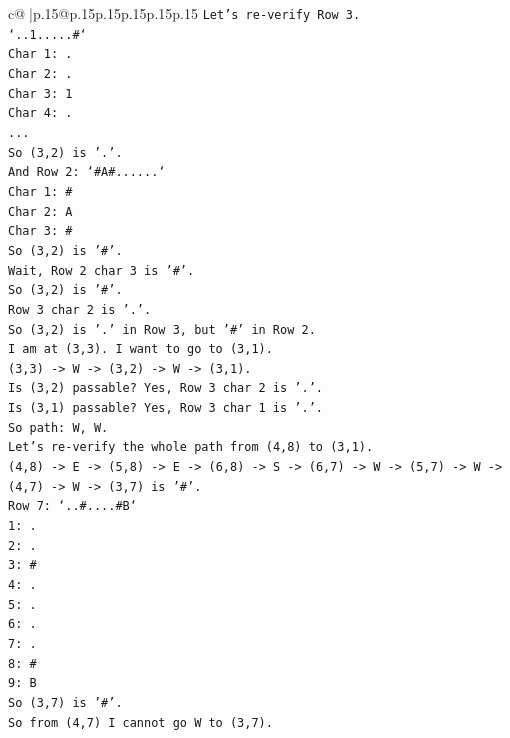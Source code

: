 \documentclass{article}
\begin{document}
{\begin{supertabular}{c@{$\;$}|p{.15\linewidth}@{}p{.15\linewidth}p{.15\linewidth}p{.15\linewidth}p{.15\linewidth}p{.15\linewidth}}
{{{\texttt{Let's re{-}verify Row 3.} \\
\texttt{`..1.....\#`} \\
\texttt{Char 1: .} \\
\texttt{Char 2: .} \\
\texttt{Char 3: 1} \\
\texttt{Char 4: .} \\
\texttt{...} \\
\texttt{So (3,2) is '.'.} \\
\texttt{And Row 2: `\#A\#......`} \\
\texttt{Char 1: \#} \\
\texttt{Char 2: A} \\
\texttt{Char 3: \#} \\
\texttt{So (3,2) is '\#'.} \\
\texttt{Wait, Row 2 char 3 is '\#'.} \\
\texttt{So (3,2) is '\#'.} \\
\texttt{Row 3 char 2 is '.'.} \\
\texttt{So (3,2) is '.' in Row 3, but '\#' in Row 2.} \\
\texttt{I am at (3,3). I want to go to (3,1).} \\
\texttt{(3,3) {-}> W {-}> (3,2) {-}> W {-}> (3,1).} \\
\texttt{Is (3,2) passable? Yes, Row 3 char 2 is '.'.} \\
\texttt{Is (3,1) passable? Yes, Row 3 char 1 is '.'.} \\
\texttt{So path: W, W.} \\
\texttt{Let's re{-}verify the whole path from (4,8) to (3,1).} \\
\texttt{(4,8) {-}> E {-}> (5,8) {-}> E {-}> (6,8) {-}> S {-}> (6,7) {-}> W {-}> (5,7) {-}> W {-}> (4,7) {-}> W {-}> (3,7) is '\#'.} \\
\texttt{Row 7: `..\#....\#B`} \\
\texttt{1: .} \\
\texttt{2: .} \\
\texttt{3: \#} \\
\texttt{4: .} \\
\texttt{5: .} \\
\texttt{6: .} \\
\texttt{7: .} \\
\texttt{8: \#} \\
\texttt{9: B} \\
\texttt{So (3,7) is '\#'.} \\
\texttt{So from (4,7) I cannot go W to (3,7).} \\
}}}
\end{supertabular}}
\end{document}
